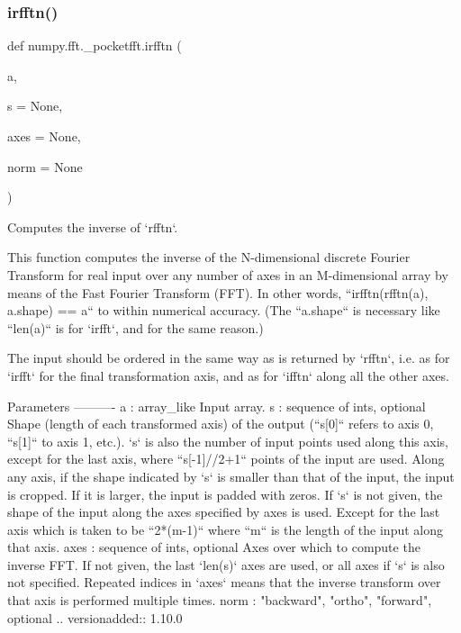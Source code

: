 \subsubsection{\texorpdfstring{irfftn()}{irfftn()}}
{\footnotesize\ttfamily def numpy.\+fft.\+\_\+pocketfft.\+irfftn (\begin{DoxyParamCaption}\item[{}]{a,  }\item[{}]{s = {\ttfamily None},  }\item[{}]{axes = {\ttfamily None},  }\item[{}]{norm = {\ttfamily None} }\end{DoxyParamCaption})}

\begin{DoxyVerb}Computes the inverse of `rfftn`.

This function computes the inverse of the N-dimensional discrete
Fourier Transform for real input over any number of axes in an
M-dimensional array by means of the Fast Fourier Transform (FFT).  In
other words, ``irfftn(rfftn(a), a.shape) == a`` to within numerical
accuracy. (The ``a.shape`` is necessary like ``len(a)`` is for `irfft`,
and for the same reason.)

The input should be ordered in the same way as is returned by `rfftn`,
i.e. as for `irfft` for the final transformation axis, and as for `ifftn`
along all the other axes.

Parameters
----------
a : array_like
    Input array.
s : sequence of ints, optional
    Shape (length of each transformed axis) of the output
    (``s[0]`` refers to axis 0, ``s[1]`` to axis 1, etc.). `s` is also the
    number of input points used along this axis, except for the last axis,
    where ``s[-1]//2+1`` points of the input are used.
    Along any axis, if the shape indicated by `s` is smaller than that of
    the input, the input is cropped.  If it is larger, the input is padded
    with zeros. If `s` is not given, the shape of the input along the axes
    specified by axes is used. Except for the last axis which is taken to
    be ``2*(m-1)`` where ``m`` is the length of the input along that axis.
axes : sequence of ints, optional
    Axes over which to compute the inverse FFT. If not given, the last
    `len(s)` axes are used, or all axes if `s` is also not specified.
    Repeated indices in `axes` means that the inverse transform over that
    axis is performed multiple times.
norm : {"backward", "ortho", "forward"}, optional
    .. versionadded:: 1.10.0


\end{DoxyVerb}
